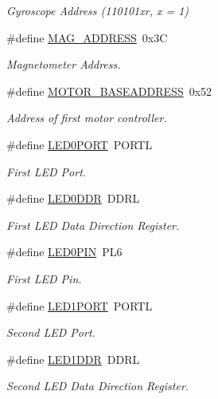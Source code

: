 \begin{DoxyCompactItemize}
\begin{DoxyCompactList}\small\item\em Gyroscope Address (110101xr, x = 1) \end{DoxyCompactList}\item 
\#define \hyperlink{group__config_gade4e63fac819c67040e374f08d2d7230}{M\-A\-G\-\_\-\-A\-D\-D\-R\-E\-S\-S}~0x3\-C
\begin{DoxyCompactList}\small\item\em Magnetometer Address. \end{DoxyCompactList}\item 
\#define \hyperlink{group__config_ga6e8ab18bbb1ef1b1e929c627f18224a3}{M\-O\-T\-O\-R\-\_\-\-B\-A\-S\-E\-A\-D\-D\-R\-E\-S\-S}~0x52
\begin{DoxyCompactList}\small\item\em Address of first motor controller. \end{DoxyCompactList}\item 
\#define \hyperlink{group__config_gac0f99671c3447a31e5d3755e1f11ee1f}{L\-E\-D0\-P\-O\-R\-T}~P\-O\-R\-T\-L
\begin{DoxyCompactList}\small\item\em First L\-E\-D Port. \end{DoxyCompactList}\item 
\#define \hyperlink{group__config_ga86208659221ec2a932cd722dfc18101f}{L\-E\-D0\-D\-D\-R}~D\-D\-R\-L
\begin{DoxyCompactList}\small\item\em First L\-E\-D Data Direction Register. \end{DoxyCompactList}\item 
\#define \hyperlink{group__config_gab0e1f692e2b1fa1cdbb24a9926b3489d}{L\-E\-D0\-P\-I\-N}~P\-L6
\begin{DoxyCompactList}\small\item\em First L\-E\-D Pin. \end{DoxyCompactList}\item 
\#define \hyperlink{group__config_ga3931891a757b08dbdfeaa8afd4dcb664}{L\-E\-D1\-P\-O\-R\-T}~P\-O\-R\-T\-L
\begin{DoxyCompactList}\small\item\em Second L\-E\-D Port. \end{DoxyCompactList}\item 
\#define \hyperlink{group__config_gab0f33b52cdb68e643eba6cf583fb625f}{L\-E\-D1\-D\-D\-R}~D\-D\-R\-L
\begin{DoxyCompactList}\small\item\em Second L\-E\-D Data Direction Register. \end{DoxyCompactList}\item 

\end{DoxyCompactItemize}
